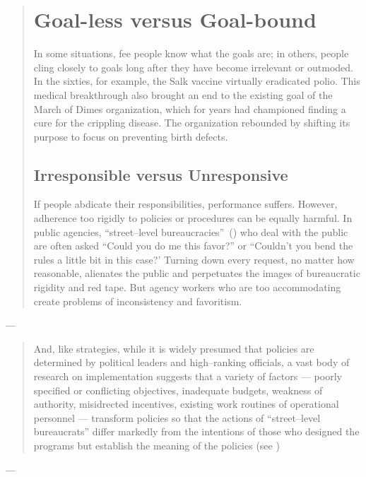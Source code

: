\documentclass[10pt]{article}
\begin{document}
\begin{quote}

\section*{Goal-less versus Goal-bound}
In some situations, fee people know what the goals are; in others, people cling closely to goals long after they have become irrelevant or outmoded. In the sixties, for example, the Salk vaccine virtually eradicated polio. This medical breakthrough also brought an end to the existing goal of the March of Dimes organization, which for years had championed finding a cure for the crippling disease. The organization rebounded by shifting its purpose to focus on preventing birth defects.

\subsection*{Irresponsible versus Unresponsive}
If people abdicate their responsibilities, performance suffers. However, adherence too rigidly to policies or procedures can be equally harmful. In public agencies, ``street--level bureaucracies''~(\cite{lipsky1983street}) who deal with the public are often asked ``Could you do me this favor?'' or ``Couldn't you bend the rules a little bit in this case?' Turning down every request, no matter how reasonable, alienates the public and perpetuates the images of bureaucratic rigidity and red tape. But agency workers who are too accommodating create problems of inconsistency and favoritism.
\end{quote}
--- \cite[page 73]{bolman2017reframing}


\begin{quote}
And, like strategies, while it is widely presumed that policies are determined by political leaders and high--ranking officials, a vast body of research on implementation suggests that a variety of factors --- poorly specified or conflicting objectives, inadequate budgets, weakness of authority, misidrected incentives, existing work routines of operational personnel --- transform policies so that the actions of ``street--level bureaucrats'' differ markedly from the intentions of those who designed the programs but establish the meaning of the policies (see \cite{elmore1978organizational,lipsky1983street,pressman1973implementation})
\end{quote}
--- \cite[page 319]{scott2015organizations}


\printbibliography{}
\end{document}
